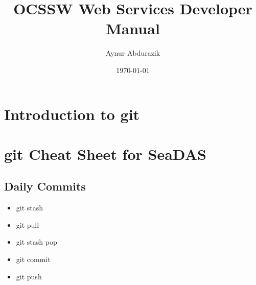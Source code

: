 \documentclass[11pt, oneside]{article}   	%
\title{OCSSW Web Services Developer Manual}
\author{Aynur Abdurazik}
\date{\today}							%
\begin{document}
\maketitle

\section{Introduction to git}

\section{git Cheat Sheet for SeaDAS}
 \subsection{Daily Commits}
 \begin{itemize}
 \item git stash
 \item git pull
 \item git stash pop
 \item git commit
 \item git push
 \end{itemize}
\end{document}
